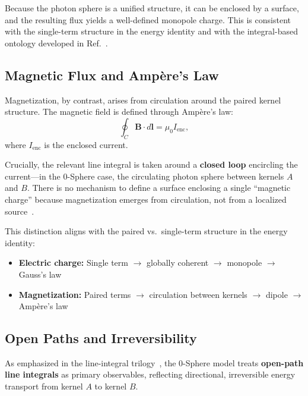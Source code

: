 \documentclass[12pt,letterpaper]{article}
\begin{document}
Because the photon sphere is a unified structure, it can be enclosed by a surface, and the resulting flux yields a well-defined monopole charge. This is consistent with the single-term structure in the energy identity and with the integral-based ontology developed in Ref.~\cite{hanamura18275142}.

\subsection{Magnetic Flux and Amp\`ere's Law}

Magnetization, by contrast, arises from circulation around the paired kernel structure. The magnetic field is defined through Amp\`ere's law:
\begin{equation}
\oint_C \mathbf{B} \cdot d\mathbf{l} = \mu_0 I_{\mathrm{enc}},
\end{equation}
where $I_{\mathrm{enc}}$ is the enclosed current.

Crucially, the relevant line integral is taken around a \textbf{closed loop} encircling the current---in the 0-Sphere case, the circulating photon sphere between kernels $A$ and $B$. There is no mechanism to define a surface enclosing a single ``magnetic charge'' because magnetization emerges from circulation, not from a localized source~\cite{hanamura18203433}.

This distinction aligns with the paired vs.\ single-term structure in the energy identity:
\begin{itemize}
\item \textbf{Electric charge:} Single term $\to$ globally coherent $\to$ monopole $\to$ Gauss's law
\item \textbf{Magnetization:} Paired terms $\to$ circulation between kernels $\to$ dipole $\to$ Amp\`ere's law
\end{itemize}

\subsection{Open Paths and Irreversibility}

As emphasized in the line-integral trilogy~\cite{hanamura18067760,hanamura18135855,hanamura18203433}, the 0-Sphere model treats \textbf{open-path line integrals} as primary observables, reflecting directional, irreversible energy transport from kernel $A$ to kernel $B$.
\end{document}
